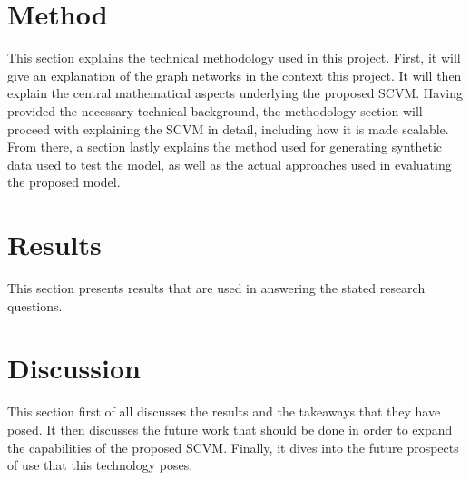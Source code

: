 \documentclass[11pt]{article}
\begin{document}

\clearpage



\section{Method}
\label{sec:Method}
This section explains the technical methodology used in this project.
First, it will give an explanation of the graph networks in the context this project. 
It will then explain the central mathematical aspects underlying the proposed SCVM. 
Having provided the necessary technical background, the methodology section will proceed with explaining the SCVM in detail, including how it is made scalable.
From there, a section lastly explains the method used for generating synthetic data used to test the model, as well as the actual approaches used in evaluating the proposed model.









\clearpage

\newcommand{\bluehref}[3][blue]{\href{#2}{\color{#1}{#3}}}%


\clearpage

\section{Results}
\label{sec:Results}
This section presents results that are used in answering the stated research questions.


\clearpage

\clearpage

\clearpage

\section{Discussion}
\label{sec:Discussion}
This section first of all discusses the results and the takeaways that they have posed.
It then discusses the future work that should be done in order to expand the capabilities of the proposed SCVM.
Finally, it dives into the future prospects of use that this technology poses.



\clearpage



\clearpage

%
%
\printbibliography
\clearpage


\end{document}
